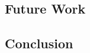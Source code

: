 \documentclass[english]{tktltiki2}
\theoremstyle{definition}
\theoremstyle{remark}
\begin{document}
\subsection{Future Work} %
\subsection{Conclusion} %

%
%




% 





\end{document}
